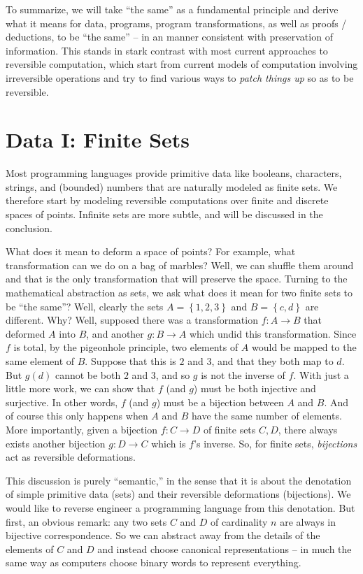 \documentclass{article}
\begin{document}
To summarize, we will take ``the same'' as a fundamental principle and
derive what it means for data, programs, program transformations, as
well as proofs / deductions, to be ``the same'' -- in an manner
consistent with preservation of information. This stands in stark
contrast with most current approaches to reversible computation, which
start from current models of computation involving irreversible
operations and try to find various ways to \emph{patch things up} so
as to be reversible.

\section{Data I: Finite Sets}
\label{sec:dataone}

Most programming languages provide primitive data like booleans,
characters, strings, and (bounded) numbers that are naturally modeled
as finite sets. We therefore start by modeling reversible computations
over finite and discrete spaces of points. Infinite sets are more
subtle, and will be discussed in the conclusion.

What does it mean to deform a space of points? For example, what
transformation can we do on a bag of marbles? Well, we can shuffle
them around and that is the only transformation that will preserve the
space. Turning to the mathematical abstraction as sets, we ask what
does it mean for two finite sets to be ``the same''?  Well, clearly
the sets $A = \left\{1, 2, 3\right\}$ and $B = \left\{c, d\right\}$
are different.  Why?  Well, supposed there was a transformation
$f : A \rightarrow B$ that deformed $A$ into $B$, and another
$g : B \rightarrow A$ which undid this transformation. Since $f$ is
total, by the pigeonhole principle, two elements of $A$ would be
mapped to the same element of $B$. Suppose that this is $2$ and $3$,
and that they both map to $d$.  But $g(d)$ cannot be both $2$ and $3$,
and so $g$ is not the inverse of $f$. With just a little more work, we
can show that $f$ (and $g$) must be both injective and surjective. In
other words, $f$ (and $g$) must be a bijection between $A$ and $B$.
And of course this only happens when $A$ and $B$ have the same number
of elements. More importantly, given a bijection $f : C \rightarrow D$
of finite sets $C,D$, there always exists another bijection
$g : D \rightarrow C$ which is $f$'s inverse. So, for finite sets,
\emph{bijections} act as reversible deformations.

This discussion is purely ``semantic,'' in the sense that it is about
the denotation of simple primitive data (sets) and their reversible
deformations (bijections).  We would like to reverse engineer a programming
language from this denotation. But first, an obvious remark: any two sets
$C$ and $D$ of cardinality $n$ are always in bijective correspondence. So
we can abstract away from the details of the elements of $C$ and $D$ and
instead choose canonical representations -- in much the same way as computers
choose binary words to represent everything.
\end{document}
